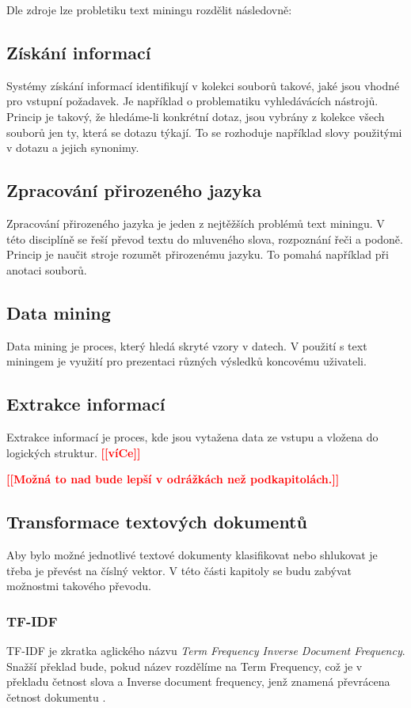 \documentclass[thesis=M,czech]{FITthesis}[2012/10/20]
\newcommand{\todo}[1]{\textcolor{red}{\textbf{[[#1]]}}}
\begin{document}
		Dle zdroje \cite{textAlg} lze probletiku text miningu rozdělit následovně:
		
		\subsection{Získání informací}
			Systémy získání informací identifikují v kolekci souborů takové, jaké jsou vhodné pro vstupní požadavek. Je například o problematiku vyhledávácích nástrojů. Princip je takový, že hledáme-li konkrétní dotaz, jsou vybrány z kolekce všech souborů jen ty, která se dotazu týkají. To se rozhoduje například slovy použitými v dotazu a jejich synonimy.
		
		\subsection{Zpracování přirozeného jazyka}
			Zpracování přirozeného jazyka je jeden z nejtěžších problémů text miningu. V této disciplíně se řeší převod textu do mluveného slova, rozpoznání řeči a podoně. Princip je naučit stroje rozumět přirozenému jazyku. To pomahá například při anotaci souborů.
			
		\subsection{Data mining}
			Data mining je proces, který hledá skryté vzory v datech. V použití s text miningem je využití pro prezentaci různých výsledků koncovému uživateli.
			
		\subsection{Extrakce informací}
			Extrakce informací je proces, kde jsou vytažena data ze vstupu a vložena do logických struktur. \todo{víCe}\cite{SankarSureshTextMining}
		
		\todo{Možná to nad bude lepší v odrážkách než podkapitolách.}
		
		\subsection{Transformace textových dokumentů}
		 Aby bylo možné jednotlivé textové dokumenty klasifikovat nebo shlukovat je třeba je převést na číslný vektor. V této části kapitoly se budu zabývat možnostmi takového převodu.
	
		\subsubsection{TF-IDF}
			\label{subsub:tf-idf}
			TF-IDF je zkratka aglického názvu \textit{Term Frequency Inverse Document Frequency}. Snažší překlad bude, pokud název rozdělíme na Term Frequency, což je v překladu četnost slova a Inverse document frequency, jenž znamená převrácena četnost dokumentu \cite{RamosTF-IDF}.
			
\end{document}
